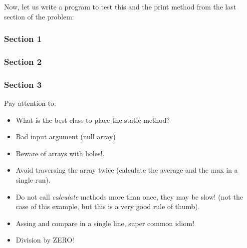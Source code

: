 \documentclass[a4paper, 9pt]{extarticle}
\begin{document}
Now, let us write a program to test this and the print method from the last section of the problem:



\newpage

\subsubsection{Section 1}



\subsubsection{Section 2}



\newpage

\subsubsection{Section 3}

\begin{multicols}{2}
Pay attention to:

\begin{itemize}

  \item What is the best class to place the static method?

  \item Bad input argument (null array)

  \item Beware of arrays with holes!.

  \item Avoid traversing the array twice (calculate the average and
    the max in a single run).

  \item Do not call \emph{calculate} methods more than once, they may be slow!
    (not the case of this example, but this is a very good rule of thumb).

  \item Assing and compare in a single line, super common idiom!

  \item Division by ZERO!

\end{itemize}
\columnbreak
{}
\end{multicols}
\end{document}
